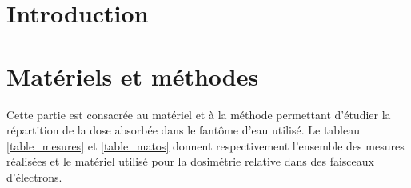 \documentclass{article}
\begin{document}




\onehalfspacing

\pagestyle{fancy}
\renewcommand\headrulewidth{0.5pt}
\renewcommand\footrulewidth{0.5pt}
\fancyfoot[R]{\thepage}

\tableofcontents
\clearpage
\section{Introduction}



\section{Matériels et méthodes}

Cette partie est consacrée au matériel et à la méthode permettant d'étudier la répartition de la dose absorbée dans le fantôme d'eau utilisé. Le tableau \ref*{table_mesures} et \ref*{table_matos} donnent respectivement l'ensemble des mesures réalisées et le matériel utilisé pour la dosimétrie relative dans des faisceaux d'électrons.
\end{document}
